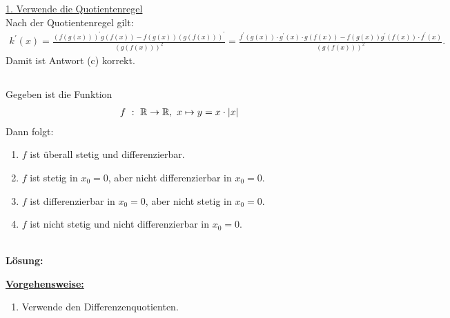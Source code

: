 \underline{1. Verwende die Quotientenregel}\\
Nach der Quotientenregel gilt:
\begin{align*}
	k^\prime(x)
	=
	\frac{(f(g(x)))^\prime g(f(x)) - f(g(x)) (g(f(x)))^\prime}{(g(f(x)))^2}
	=
	\frac{f^\prime(g(x)) \cdot g^\prime(x) \cdot g(f(x))
		- 
		f(g(x)) g^\prime(f(x)) \cdot f^\prime(x)
		}{(g(f(x)))^2}.
\end{align*}
Damit ist Antwort (c) korrekt.


\newpage
\subsection*{}
Gegeben ist die Funktion
\begin{align*}
	f \ : \ \mathbb{R} \rightarrow \mathbb{R}, \ x \mapsto y = x \cdot |x| 
\end{align*}
Dann folgt:
\renewcommand{\labelenumi}{(\alph{enumi})}
\begin{enumerate}
	\item 
	$ f $ ist überall stetig und differenzierbar.
	\item
	$ f $ ist stetig in $ x_0 = 0 $, aber nicht differenzierbar in $ x_0 = 0 $.
	\item
	$ f $ ist differenzierbar in $ x_0 = 0 $, aber nicht stetig in $ x_0 = 0 $.
	\item
    $ f $ ist nicht stetig und nicht differenzierbar in $ x_0 = 0 $.
\end{enumerate}
\ \\
\textbf{Lösung:}
\begin{mdframed}
	\underline{\textbf{Vorgehensweise:}}
	\renewcommand{\labelenumi}{\theenumi.}
	\begin{enumerate}
		\item Verwende den Differenzenquotienten.
	\end{enumerate}
\end{mdframed}


